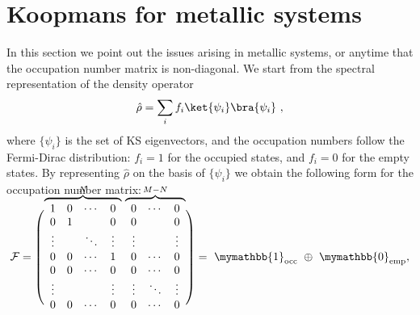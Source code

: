\chapter{Koopmans for metallic systems\label{app:koopmans-metals}}
In this section we point out the issues arising in metallic systems, or anytime that the occupation number matrix is non-diagonal. We start from the spectral representation of the density operator
%
\begin{equation}
    \hat{\rho} = \sum_i f_i \ket{\psi_i} \bra{\psi_i} \ ,
    \label{eq:density-matrix-diag}
\end{equation}
%
where $\{ \psi_i \}$ is the set of KS eigenvectors, and the occupation numbers follow the Fermi-Dirac distribution: $f_i=1$ for the occupied states, and $f_i=0$ for the empty states. By representing $\hat{\rho}$ on the basis of $\{ \psi_i \}$ we obtain the following form for the occupation number matrix:

\begin{equation}
    \mathcal{F} = 
    \left(\vphantom{\begin{array}{c}1\\1\\1\\1\\1\\1\\1\end{array}}
    \smash{\overbrace{
        \begin{array}{cccc}
            1      & 0      & \cdots & 0      \\
            0      & 1      &        & 0      \\
            \vdots &        & \ddots & \vdots \\
            0      & 0      & \cdots & 1      \\
            0      & 0      & \cdots & 0      \\
            \vdots &        &        & \vdots \\
            0      & 0      & \cdots & 0      \\
        \end{array}
        }^{N}} \ 
        \smash{\overbrace{
        \begin{array}{ccc}
            0      & \cdots & 0      \\
            0      &        & 0      \\
            \vdots &        & \vdots \\
            0      & \cdots & 0      \\
            0      & \cdots & 0      \\
            \vdots & \ddots & \vdots \\
            0      & \cdots & 0      \\
        \end{array}
        }^{M-N}}
    \right)
    = \ \mymathbb{1}_{\rm occ} \ \oplus \ \mymathbb{0}_{\rm emp} ,
    \label{eq:occ-num-matrix}
\end{equation}

